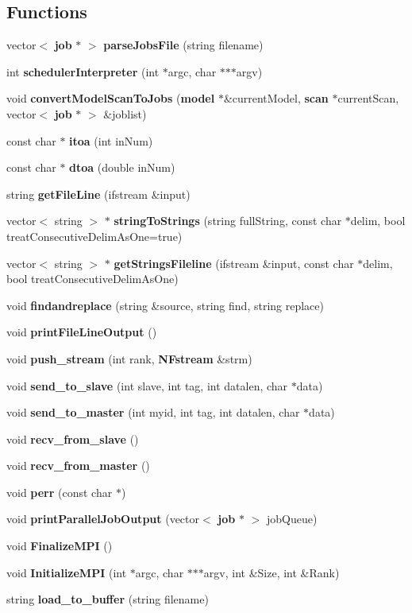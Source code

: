 \subsection*{Functions}
\begin{CompactItemize}
\item 
vector$<$ {\bf job} $\ast$ $>$ {\bf parseJobsFile} (string filename)
\item 
int {\bf schedulerInterpreter} (int $\ast$argc, char $\ast$$\ast$$\ast$argv)
\item 
void {\bf convertModelScanToJobs} ({\bf model} $\ast$\&currentModel, {\bf scan} $\ast$currentScan, vector$<$ {\bf job} $\ast$ $>$ \&joblist)
\item 
const char $\ast$ {\bf itoa} (int inNum)
\item 
const char $\ast$ {\bf dtoa} (double inNum)
\item 
string {\bf getFileLine} (ifstream \&input)
\item 
vector$<$ string $>$ $\ast$ {\bf stringToStrings} (string fullString, const char $\ast$delim, bool treatConsecutiveDelimAsOne=true)
\item 
vector$<$ string $>$ $\ast$ {\bf getStringsFileline} (ifstream \&input, const char $\ast$delim, bool treatConsecutiveDelimAsOne)
\item 
void {\bf findandreplace} (string \&source, string find, string replace)
\item 
void {\bf printFileLineOutput} ()
\item 
void {\bf push\_\-stream} (int rank, {\bf NFstream} \&strm)
\item 
void {\bf send\_\-to\_\-slave} (int slave, int tag, int datalen, char $\ast$data)
\item 
void {\bf send\_\-to\_\-master} (int myid, int tag, int datalen, char $\ast$data)
\item 
void {\bf recv\_\-from\_\-slave} ()
\item 
void {\bf recv\_\-from\_\-master} ()
\item 
void {\bf perr} (const char $\ast$)
\item 
void {\bf printParallelJobOutput} (vector$<$ {\bf job} $\ast$ $>$ jobQueue)
\item 
void {\bf FinalizeMPI} ()
\item 
void {\bf InitializeMPI} (int $\ast$argc, char $\ast$$\ast$$\ast$argv, int \&Size, int \&Rank)
\item 
string {\bf load\_\-to\_\-buffer} (string filename)
\item 

\end{CompactItemize}
